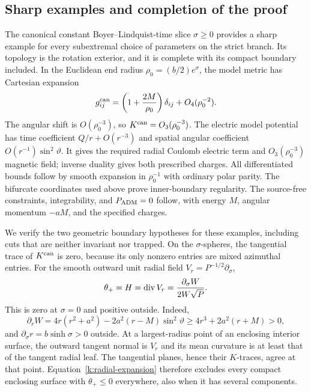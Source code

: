 \subsection{Sharp examples and completion of the proof}

The canonical constant Boyer--Lindquist-time slice
\(\sigma\ge0\) provides a sharp example for every subextremal
choice of parameters on the strict branch. Its topology is
the rotation exterior, and it is complete with its compact
boundary included. In the Euclidean end radius
\(\rho_0=(b/2)e^\sigma\), the model metric has Cartesian
expansion
\[
 g^{\rm can}_{ij}
   =\left(1+\frac{2M}{\rho_0}\right)\delta_{ij}
                                        +O_4(\rho_0^{-2}).
\]
The angular shift is \(O(\rho_0^{-3})\), so
\(K^{\rm can}=O_3(\rho_0^{-3})\). The electric model potential
has time coefficient \(Q/r+O(r^{-3})\) and spatial angular
coefficient \(O(r^{-1})\sin^2\vartheta\). It gives the required
radial Coulomb electric term and \(O_3(\rho_0^{-3})\) magnetic
field; inverse duality gives both prescribed charges.
All differentiated bounds follow by smooth expansion in
\(\rho_0^{-1}\) with ordinary polar parity. The bifurcate
coordinates used above prove inner-boundary regularity.
The source-free constraints, integrability, and
\(P_{\rm ADM}=0\) follow, with energy \(M\), angular momentum
\(-aM\), and the specified charges.

We verify the two geometric boundary hypotheses for these
examples, including cuts that are neither invariant nor
trapped. On the \(\sigma\)-spheres, the tangential trace of
\(K^{\rm can}\) is zero, because its only nonzero entries
are mixed azimuthal entries. For the smooth outward unit
radial field \(V_r=P^{-1/2}\partial_\sigma\),
\begin{equation}\label{k:radial-expansion}
 \theta_+=H=\operatorname{div} V_r
       =\frac{\partial_\sigma W}{2W\sqrt P}.
\end{equation}
This is zero at \(\sigma=0\) and positive outside. Indeed,
\[
 \partial_rW
 =4r(r^2+a^2)-2a^2(r-M)\sin^2\vartheta
 \ge4r^3+2a^2(r+M)>0 ,
\]
and \(\partial_\sigma r=b\sinh\sigma>0\) outside.
At a largest-radius point of an enclosing interior surface,
the outward tangent normal is \(V_r\) and its mean curvature
is at least that of the tangent radial leaf. The tangential
planes, hence their \(K\)-traces, agree at that point.
Equation~\eqref{k:radial-expansion} therefore excludes every
compact enclosing surface with \(\theta_+\le0\) everywhere,
also when it has several components.

